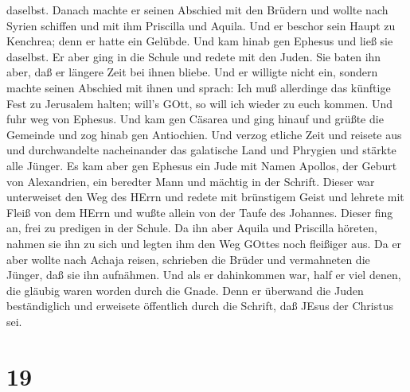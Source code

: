 daselbst. Danach machte er seinen Abschied mit den Brüdern und wollte
nach Syrien schiffen und mit ihm Priscilla und Aquila. Und er beschor
sein Haupt zu Kenchrea; denn er hatte ein Gelübde.  Und kam
hinab gen Ephesus und ließ sie daselbst. Er aber ging in die Schule und
redete mit den Juden.  Sie baten ihn aber, daß er längere
Zeit bei ihnen bliebe. Und er willigte nicht ein,  sondern
machte seinen Abschied mit ihnen und sprach: Ich muß allerdinge das
künftige Fest zu Jerusalem halten; will's GOtt, so will ich wieder zu
euch kommen. Und fuhr weg von Ephesus.  Und kam gen Cäsarea
und ging hinauf und grüßte die Gemeinde und zog hinab gen Antiochien.
 Und verzog etliche Zeit und reisete aus und durchwandelte
nacheinander das galatische Land und Phrygien und stärkte alle Jünger.
 Es kam aber gen Ephesus ein Jude mit Namen Apollos, der
Geburt von Alexandrien, ein beredter Mann und mächtig in der Schrift.
 Dieser war unterweiset den Weg des HErrn und redete mit
brünstigem Geist und lehrete mit Fleiß von dem HErrn und wußte allein
von der Taufe des Johannes.  Dieser fing an, frei zu
predigen in der Schule. Da ihn aber Aquila und Priscilla höreten, nahmen
sie ihn zu sich und legten ihm den Weg GOttes noch fleißiger aus.
 Da er aber wollte nach Achaja reisen, schrieben die Brüder
und vermahneten die Jünger, daß sie ihn aufnähmen. Und als er
dahinkommen war, half er viel denen, die gläubig waren worden durch die
Gnade.  Denn er überwand die Juden beständiglich und
erweisete öffentlich durch die Schrift, daß JEsus der Christus sei.

\hypertarget{section-18}{%
\section{19}\label{section-18}}

